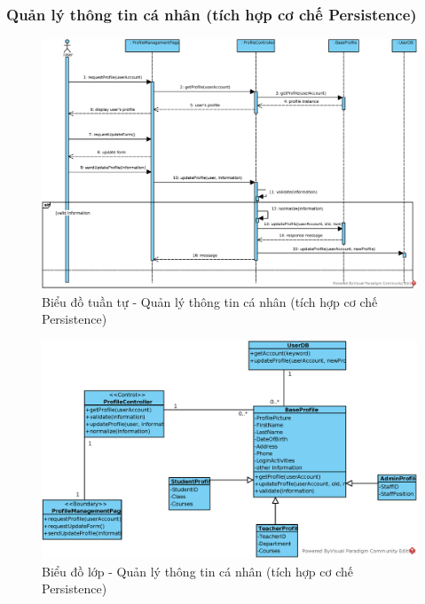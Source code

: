 \documentclass[./../main.tex]{subfiles}
\begin{document}
\subsubsection{Quản lý thông tin cá nhân (tích hợp cơ chế Persistence)}
\begin{figure}[H]
    \centering
    \includegraphics[width=\linewidth]{./images/UseCaseDesignDiagram/ucr_per_update_profile.eps}
    \caption{Biểu đồ tuần tự - Quản lý thông tin cá nhân (tích hợp cơ chế Persistence)}
\end{figure}
\begin{figure}[H]
    \centering
    \includegraphics[width=\linewidth]{./images/UseCaseDesignDiagram/ucd_per_profile.eps}
    \caption{Biểu đồ lớp - Quản lý thông tin cá nhân (tích hợp cơ chế Persistence)}
\end{figure}
\end{document}
